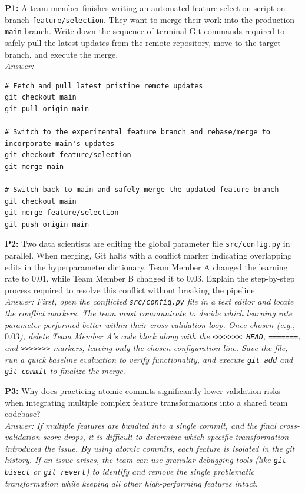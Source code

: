 \documentclass{article}
\begin{document}
\textbf{P1:} A team member finishes writing an automated feature selection script on branch \texttt{feature/selection}. They want to merge their work into the production \texttt{main} branch. Write down the sequence of terminal Git commands required to safely pull the latest updates from the remote repository, move to the target branch, and execute the merge.
\\
\textit{Answer:}
\begin{verbatim}
# Fetch and pull latest pristine remote updates
git checkout main
git pull origin main

# Switch to the experimental feature branch and rebase/merge to incorporate main's updates
git checkout feature/selection
git merge main

# Switch back to main and safely merge the updated feature branch
git checkout main
git merge feature/selection
git push origin main
\end{verbatim}

\newline
\textbf{P2:} Two data scientists are editing the global parameter file \texttt{src/config.py} in parallel. When merging, Git halts with a conflict marker indicating overlapping edits in the hyperparameter dictionary. Team Member A changed the learning rate to $0.01$, while Team Member B changed it to $0.03$. Explain the step-by-step process required to resolve this conflict without breaking the pipeline.
\\
\textit{Answer: First, open the conflicted \texttt{src/config.py} file in a text editor and locate the conflict markers. The team must communicate to decide which learning rate parameter performed better within their cross-validation loop. Once chosen (e.g., $0.03$), delete Team Member A's code block along with the \texttt{<<<<<<< HEAD}, \texttt{=======}, and \texttt{>>>>>>>} markers, leaving only the chosen configuration line. Save the file, run a quick baseline evaluation to verify functionality, and execute \texttt{git add} and \texttt{git commit} to finalize the merge.}

\newline
\textbf{P3:} Why does practicing atomic commits significantly lower validation risks when integrating multiple complex feature transformations into a shared team codebase?
\\
\textit{Answer: If multiple features are bundled into a single commit, and the final cross-validation score drops, it is difficult to determine which specific transformation introduced the issue. By using atomic commits, each feature is isolated in the git history. If an issue arises, the team can use granular debugging tools (like \texttt{git bisect} or \texttt{git revert}) to identify and remove the single problematic transformation while keeping all other high-performing features intact.}
\end{document}
